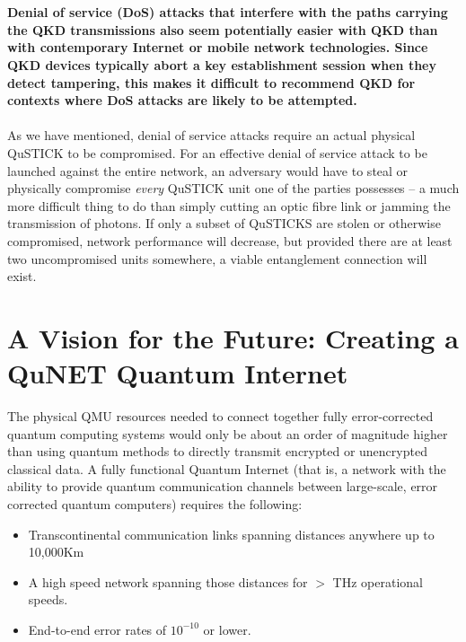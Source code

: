 \documentclass[aps,prl,twocolumn,10pt,nofootinbib]{revtex4}
\begin{document}
\\
\\
{\bf Denial of service (DoS) attacks that interfere with the paths carrying the QKD transmissions also seem potentially easier with QKD than with contemporary Internet or mobile network technologies. Since QKD devices typically abort a key establishment session when they detect tampering, this makes it difficult to recommend QKD for contexts where DoS attacks are likely to be attempted.}
\\
\\
As we have mentioned, denial of service attacks require an actual physical QuSTICK to be compromised.  For an effective denial of service attack to be launched against the entire network, an adversary would have to steal or physically compromise {\em every} QuSTICK unit one of the parties possesses -- a much more difficult thing to do than simply cutting an optic fibre link or jamming the transmission of photons.  If only a subset of QuSTICKS are stolen or otherwise compromised, network performance will decrease, but provided there are at least two uncompromised units somewhere, a viable entanglement connection will exist.  

\section{A Vision for the Future: Creating a QuNET Quantum Internet}

The physical QMU resources needed to connect together fully error-corrected quantum computing systems would only be about an order of magnitude higher than using quantum methods to directly transmit encrypted or unencrypted classical data.  A fully functional Quantum Internet (that is, a network with the ability to provide quantum communication channels between large-scale, error corrected quantum computers) requires the following:
\begin{itemize}
\item Transcontinental communication links spanning distances anywhere up to 10,000Km
\item A high speed network spanning those distances for $>$ THz operational speeds.
\item End-to-end error rates of $10^{-10}$ or lower.
\end{itemize}
\end{document}

